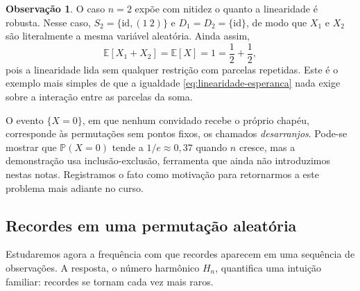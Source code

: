 \documentclass[12pt,portuguese]{article}
\theoremstyle{definition}
\newtheorem{remark}[remark]{Observação}
\begin{document}
\begin{remark}\label{rem:chapeus-dependencia}
O caso $n=2$ expõe com nitidez o quanto a linearidade é robusta. Nesse caso,
$S_2=\{\mathrm{id},(1\ 2)\}$ e $D_1=D_2=\{\mathrm{id}\}$, de modo que $X_1$ e
$X_2$ são literalmente a mesma variável aleatória. Ainda assim,
\[
\mathbb{E}[X_1+X_2]=\mathbb{E}[X]=1=\frac{1}{2}+\frac{1}{2},
\]
pois a linearidade lida sem qualquer restrição com parcelas repetidas. Este é
o exemplo mais simples de que a igualdade
\eqref{eq:linearidade-esperanca} nada exige sobre a interação entre as
parcelas da soma.

O evento $\{X=0\}$, em que nenhum convidado recebe o próprio chapéu,
corresponde às permutações sem pontos fixos, os chamados \emph{desarranjos}.
Pode-se mostrar que $\mathbb{P}(X=0)$ tende a $1/e\approx 0{,}37$ quando $n$
cresce, mas a demonstração usa inclusão-exclusão, ferramenta que ainda não
introduzimos nestas notas. Registramos o fato como motivação para
retornarmos a este problema mais adiante no curso.
\end{remark}

\subsection{Recordes em uma permutação aleatória}\label{subsec:recordes}

Estudaremos agora a frequência com que recordes aparecem em uma sequência de
observações. A resposta, o número harmônico $H_n$, quantifica
uma intuição familiar: recordes se tornam cada vez mais raros.
\end{document}
